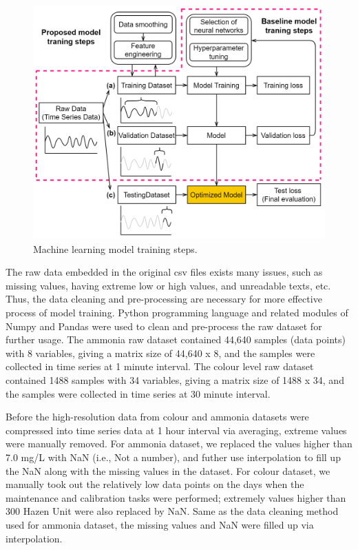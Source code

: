 \begin{figure}[h]
    \centering
    \includegraphics[width=0.9\columnwidth]{imgs/pre-processing/training-scheme.png}
    \caption{Machine learning model training steps.}
    \label{fig:training-scheme}
\end{figure}

The raw data embedded in the original csv files exists many issues, such as missing values, having extreme low or high values, and unreadable texts, etc. Thus, the data cleaning and pre-processing are necessary for more effective process of model training. Python programming language and related modules of Numpy and Pandas were used to clean and pre-process the raw dataset for further usage. The ammonia raw dataset contained 44,640 samples (data points) with 8 variables, giving a matrix size of 44,640 x 8, and the samples were collected in time series at 1 minute interval. The colour level raw dataset contained 1488 samples with 34 variables, giving a matrix size of 1488 x 34, and the samples were collected in time series at 30 minute interval.

Before the high-resolution data from colour and ammonia datasets were compressed into time series data at 1 hour interval via averaging, extreme values were manually removed. For ammonia dataset, we replaced the values higher than 7.0 mg/L with NaN (i.e., Not a number), and futher use interpolation to fill up the NaN along with the missing values in the dataset. For colour dataset, we manually took out the relatively low data points on the days when the maintenance and calibration tasks were performed; extremely values higher than 300 Hazen Unit were also replaced by NaN. Same as the data cleaning method used for ammonia dataset, the missing values and NaN were filled up via interpolation.


